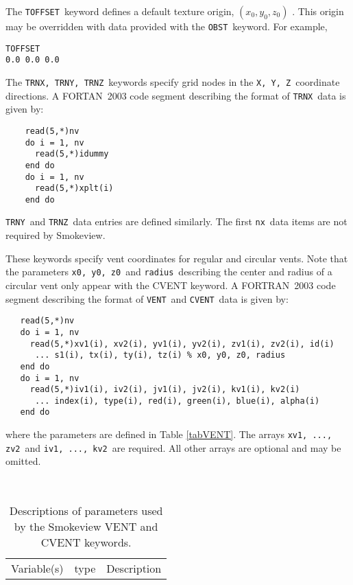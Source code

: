 \documentclass[11pt,twoside]{book}
\begin{document}
{\begin{table}[bph]
\begin{center}
\begin{tabular}{|l|l|l|}
\end{tabular}
\label{tabOBST}
\end{center}
\end{table}

The {\tt TOFFSET}\ keyword defines a default texture origin, $(x_0, y_0, z_0)$ .
This origin may be overridden with data provided with the {\tt OBST}\ keyword. For example,

\begin{lstlisting}
TOFFSET
0.0 0.0 0.0
\end{lstlisting}

The {\tt TRNX, TRNY, TRNZ}\ keywords specify
grid nodes in the {\tt X, Y, Z}\ coordinate directions.  A
FORTAN~2003 code segment describing the format of {\tt TRNX}\ data
is given by:
\begin{lstlisting}
    read(5,*)nv
    do i = 1, nv
      read(5,*)idummy
    end do
    do i = 1, nv
      read(5,*)xplt(i)
    end do
\end{lstlisting}
{\tt TRNY}\ and {\tt TRNZ}\ data entries are defined similarly. The
first {\tt nx}\ data items are not required by Smokeview.

These keywords specify vent coordinates for regular and circular vents.
Note that the parameters {\tt x0, y0, z0}\ and {\tt radius}\ describing the center and radius
of a circular vent
only appear with the CVENT keyword.
A FORTRAN~2003
code segment describing the format of {\tt VENT}\ and {\tt CVENT}\ data is given by:
\begin{lstlisting}
   read(5,*)nv
   do i = 1, nv
     read(5,*)xv1(i), xv2(i), yv1(i), yv2(i), zv1(i), zv2(i), id(i)
      ... s1(i), tx(i), ty(i), tz(i) % x0, y0, z0, radius
   end do
   do i = 1, nv
     read(5,*)iv1(i), iv2(i), jv1(i), jv2(i), kv1(i), kv2(i)
      ... index(i), type(i), red(i), green(i), blue(i), alpha(i)
   end do
\end{lstlisting}
where the parameters are defined in Table \ref{tabVENT}.
The arrays {\tt xv1,  ..., zv2}\ and {\tt iv1, ..., kv2}\ are
required. All other arrays are optional and may be omitted.

\renewcommand{\arraystretch}{1.2}
\begin{table}[bph]
\begin{center}
\caption{Descriptions of parameters used by the Smokeview VENT and
CVENT keywords.}\ \vspace{0.1in}
\begin{tabular}{|l|l|l|}
\hline Variable(s) &  type & Description  \\


\end{tabular}
\end{center}
\end{table}}
\end{document}
